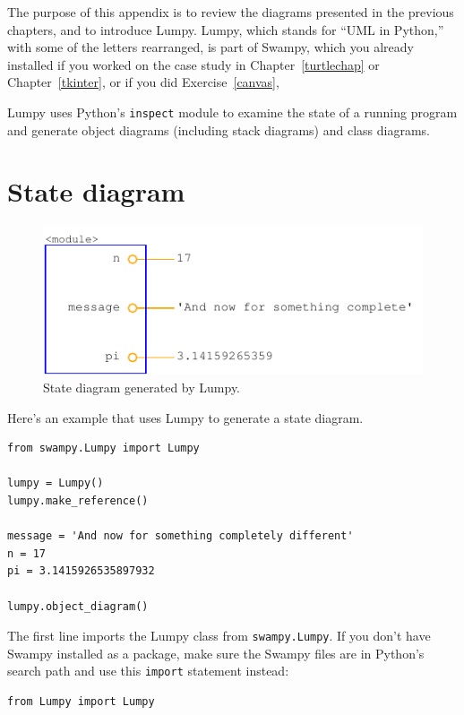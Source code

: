 \documentclass[10pt]{book}
\begin{document}
The purpose of this appendix is to review the diagrams presented in
the previous chapters, and to introduce Lumpy.  Lumpy, which stands
for ``UML in Python,'' with some of the letters rearranged, is part of
Swampy, which you already installed if you worked on the case study in
Chapter~\ref{turtlechap} or Chapter~\ref{tkinter}, or if you did
Exercise~\ref{canvas},

Lumpy uses Python's {\tt inspect} module to examine the state of a running
program and generate object diagrams (including stack diagrams) and
class diagrams.

\section{State diagram}

\begin{figure}
\centerline
{\includegraphics[scale=0.7]{figs/lumpydemo1.pdf}}
\caption{State diagram generated by Lumpy.}
\label{fig.lumpy1}
\end{figure}

Here's an example that uses Lumpy to generate a state diagram.
 

\begin{verbatim}
from swampy.Lumpy import Lumpy

lumpy = Lumpy()
lumpy.make_reference()

message = 'And now for something completely different'
n = 17
pi = 3.1415926535897932

lumpy.object_diagram()
\end{verbatim}

The first line imports the Lumpy class from {\tt swampy.Lumpy}.
If you don't have Swampy installed as a package, make sure
the Swampy files are in Python's search path and use this
{\tt import} statement instead:

\begin{verbatim}
from Lumpy import Lumpy
\end{verbatim}
\end{document}
